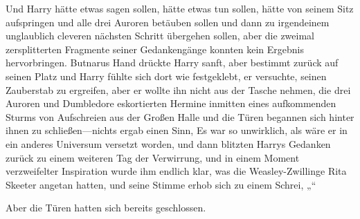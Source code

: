 Und Harry hätte etwas sagen sollen, hätte etwas tun sollen, hätte von seinem Sitz aufspringen und alle drei Auroren betäuben sollen und dann zu irgendeinem unglaublich cleveren nächsten Schritt übergehen sollen, aber die zweimal zersplitterten Fragmente seiner Gedankengänge konnten kein Ergebnis hervorbringen. Butnarus Hand drückte Harry sanft, aber bestimmt zurück auf seinen Platz und Harry fühlte sich dort wie festgeklebt, er versuchte, seinen Zauberstab zu ergreifen, aber er wollte ihn nicht aus der Tasche nehmen, die drei Auroren und Dumbledore eskortierten Hermine inmitten eines aufkommenden Sturms von Aufschreien aus der Großen Halle und die Türen begannen sich hinter ihnen zu schließen—nichts ergab einen Sinn, Es war so unwirklich, als wäre er in ein anderes Universum versetzt worden, und dann blitzten Harrys Gedanken zurück zu einem weiteren Tag der Verwirrung, und in einem Moment verzweifelter Inspiration wurde ihm endlich klar, was die Weasley-Zwillinge Rita Skeeter angetan hatten, und seine Stimme erhob sich zu einem Schrei, „“

Aber die Türen hatten sich bereits geschlossen.

\later

